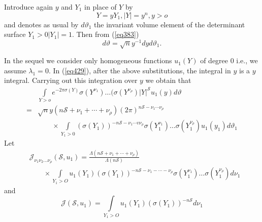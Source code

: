 Introduce again $y$ and $Y_1$ in place of $Y$ by
$$
Y = y Y_1 , |Y| = y^n , y > o
$$
and denotes as usual by $d \vartheta_1$ the invariant volume element
of the determinant surface $Y_1 > 0 |Y_1| =1$. Then from (\ref{eq383}) 
$$
d \vartheta = \sqrt{n}  y ^{-1} d y d \vartheta_1.
$$

In the sequel we consider only homogeneous functions $u_1 (Y)$ of
degree 0 i.e., we assume $\lambda_1 = 0$. In (\ref{eq429}), after the above
substitutions, the integral in $y$ is a $y$ integral. Carrying
out this integration over $y$ we obtain that  
\begin{align*}
& \int\limits_{Y > o} e^{- 2 \pi \sigma (Y)}{\sigma (Y^{\nu_1})}\dots (\sigma
(Y^{\nu_\rho}) |Y|^\mathscr{S} u_1 (y) d \vartheta\\
 =  & \sqrt{n}
y (n \mathscr{S} + \nu_1 +\cdots+ \nu_\rho) (2 \pi) ^{n
  \mathscr{S} - \nu_1 \cdots \nu_\rho } \\
&  \qquad \times \int\limits_{Y_1 > 0}
(\sigma(Y_1))^{-n \mathscr{S} -\nu_1 \cdots v\nu_\rho} \sigma
(Y_1^{\nu_1}) \dots \sigma (Y_1^{\nu_\rho}) u_1 (y_1) d \vartheta_1 
\end{align*}
Let
\begin{align*}
& \mathcal{J}_{\nu_1 \nu_2 \ldots \nu_\rho} (\mathscr{S},u_1) =
\frac{\Lambda (n \mathscr{S} + \nu_1 + \cdots + \nu_{\rho})}{\Lambda
  (n\mathscr{S})} \\
& \qquad   \times \int\limits_{Y_1 > O}
u_1(Y_1)(\sigma(Y_1))^{-n\mathscr{S}-\nu_1 - \cdots - \nu_{\rho}}
\sigma(Y^{\nu_1}_1) \ldots \sigma(Y^{\nu_\rho}_1) d\nu_1 \tag{430}\label{eq430} 
\end{align*}\pageoriginale
and 
\begin{equation*}
\mathcal{J}(\mathscr{S},u_1) = \int\limits_{Y_1 > O}  u_1(Y_1)
(\sigma(Y_1))^{-n\mathscr{S}}   d\nu_1 \tag{431}\label{eq431} 
\end{equation*}

